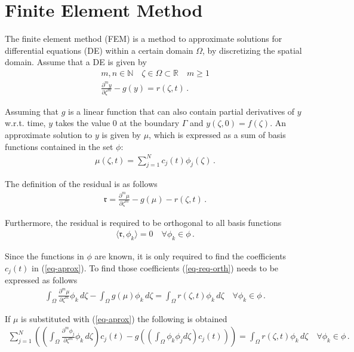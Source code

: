 \section{Finite Element Method} \label{FEM}
The finite element method (FEM) is a method to approximate solutions for differential equations (DE) within a certain domain \(\Omega\), by discretizing the spatial domain.
Assume that a DE is given by
\begin{gather}
m, n \in \mathbb{N} \quad \zeta \in \Omega \subset \mathbb{R} \quad m \geq 1 \\
\frac{\partial^{m} y}{\partial \zeta^{m}} -  g(y) = r(\zeta, t) \,. \label{eq-pde-gen} 
\end{gather}

Assuming that \(g\) is a linear function that can also contain partial derivatives of \(y\) w.r.t. time, \(y\) takes the value 0 at the boundary \(\Gamma\) and \(y(\zeta, 0) = f(\zeta)\).
An approximate solution to \(y\) is given by \(\mu\), which is expressed as a sum of basis functions contained in the set \(\phi\):
\begin{gather}
\mu(\zeta, t) = \sum_{j = 1}^{N} c_{j}(t)\phi_{j}(\zeta) \,. \label{eq-aprox}
\end{gather}

The definition of the residual is as follows
\begin{gather}
\mathfrak{r} = \frac{\partial^{m} \mu}{\partial \zeta^{m}} -  g(\mu) - r(\zeta, t) \,.
\end{gather}

Furthermore, the residual is required to be orthogonal to all basis functions
\begin{gather}
\langle \mathfrak{r}, \phi_{k} \rangle = 0 \quad \forall \phi_{k} \in \phi \,. \label{eq-req-orth}
\end{gather}

Since the functions in \(\phi\) are known, it is only required to find the coefficients \(c_{j}(t)\) in (\ref{eq-aprox}).
To find those coefficients (\ref{eq-req-orth}) needs to be expressed as follows
\begin{gather}
\int_{\Omega} \frac{\partial^{m} \mu}{\partial \zeta^{m}} \phi_{k} \, d\zeta  -  \int_{\Omega} g(\mu) \phi_{k}        \, d\zeta = \int_{\Omega}  r(\zeta, t) \phi_{k}        \, d\zeta \quad \forall \phi_{k} \in \phi \,. 
\end{gather}

If \(\mu\) is substituted with (\ref{eq-aprox}) the following is obtained
\begin{gather}
\sum_{j = 1}^{N} \left( \left( \int_{\Omega} \frac{\partial^{m} \phi_{j}}{\partial \zeta^{m}} \phi_{k} \, d\zeta\right) c_{j}(t) - g\left( \left(\int_{\Omega} \phi_k \phi_j d\zeta\right) c_{j}(t)\right) \right)  = \int_{\Omega}  r(\zeta, t) \phi_{k}        \, d\zeta \quad \forall \phi_{k} \in \phi \,. \label{eq-al}
\end{gather}

